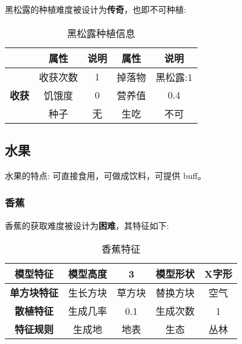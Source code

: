 黑松露的种植难度被设计为\textbf{传奇}，也即不可种植:

\begin{table}[H]
    \centering
    \caption{黑松露种植信息}
    \label{table:黑松露种植信息}
    \setlength{\tabcolsep}{4mm}
    \begin{tabular}{c|cc|cc}
        \toprule
                                           & \textbf{属性} & \textbf{说明} & \textbf{属性} & \textbf{说明} \\
        \midrule
        \multirow{3}{*}{\textbf{收获}}     & 收获次数      & 1             & 掉落物        & 黑松露:1      \\
                                           & 饥饿度        & 0             & 营养值        & 0.4           \\
                                           & 种子          & 无  & 生吃          & 不可   \\
        \bottomrule
    \end{tabular}
\end{table}

\subsection{水果}

水果的特点: 可直接食用，可做成饮料，可提供 buff。

\subsubsection{香蕉}

香蕉的获取难度被设计为\textbf{困难}，其特征如下:
\begin{table}[H]
    \centering
    \caption{香蕉特征}
    \label{table:香蕉特征}
    \setlength{\tabcolsep}{4mm}
    \begin{tabular}{c|cc|cc}
        \toprule
        \textbf{模型特征}   & 模型高度 & 3      & 模型形状 & X字形 \\
        \midrule
        \textbf{单方块特征} & 生长方块 & 草方块 & 替换方块 & 空气  \\
        \midrule
        \textbf{散植特征}   & 生成几率 & 0.1    & 生成次数 & 1     \\
        \midrule
        \textbf{特征规则}   & 生成地   & 地表   & 生态     & 丛林  \\
        \bottomrule
    \end{tabular}
\end{table}


